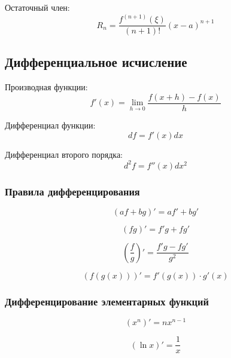 \documentclass[a4paper,12pt]{article}
\begin{document}
Остаточный член:
\begin{equation}
R_n = \frac{f^{(n+1)}(\xi)}{(n+1)!}(x-a)^{n+1}
\end{equation}

\subsection{Дифференциальное исчисление}

Производная функции:
\begin{equation}
f'(x) = \lim_{h \to 0} \frac{f(x+h) - f(x)}{h}
\end{equation}

Дифференциал функции:
\begin{equation}
df = f'(x)dx
\end{equation}

Дифференциал второго порядка:
\begin{equation}
d^2 f = f''(x)dx^2
\end{equation}

\subsubsection{Правила дифференцирования}

\begin{equation}
(af + bg)' = af' + bg'
\end{equation}

\begin{equation}
(fg)' = f'g + fg'
\end{equation}

\begin{equation}
\left(\frac{f}{g}\right)' = \frac{f'g - fg'}{g^2}
\end{equation}

\begin{equation}
(f(g(x)))' = f'(g(x)) \cdot g'(x)
\end{equation}

\subsubsection{Дифференцирование элементарных функций}

\begin{equation}
(x^n)' = nx^{n-1}
\end{equation}

\begin{equation}
(\ln x)' = \frac{1}{x}
\end{equation}
\end{document}
